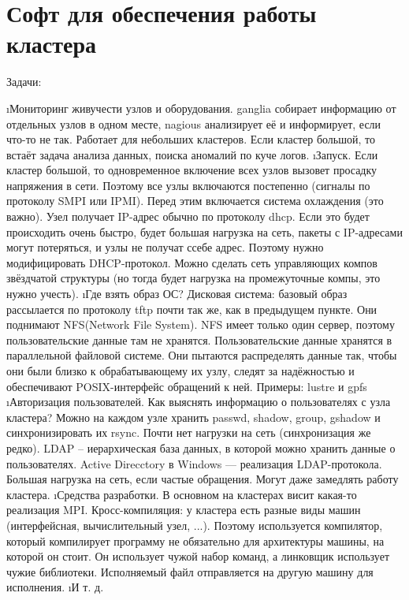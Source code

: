 \section{Софт для обеспечения работы кластера}
Задачи:
\begin{enumerate}
 \i Мониторинг живучести узлов и оборудования.
 ganglia собирает информацию от отдельных узлов  в одном месте, nagious анализирует её и информирует, если что-то не так. Работает для небольших кластеров.
 Если кластер большой, то встаёт задача анализа данных, поиска аномалий по куче логов. 
 \i Запуск. Если кластер большой, то одновременное включение всех узлов вызовет просадку напряжения в сети. Поэтому все узлы включаются постепенно (сигналы по протоколу SMPI или IPMI).
  Перед этим включается система охлаждения (это важно). 
  Узел получает IP-адрес обычно по протоколу dhcp. Если это будет происходить очень быстро, будет большая нагрузка на сеть, пакеты с IP-адресами могут потеряться, и узлы не получат ссебе адрес. Поэтому нужно модифицировать DHCP-протокол. Можно сделать сеть управляющих компов звёздчатой структуры (но тогда будет нагрузка на промежуточные компы, это нужно учесть).
 \i Где взять образ ОС?
   Дисковая система: базовый образ рассылается по протоколу tftp почти так же, как в предыдущем пункте. Они поднимают NFS(Network File System). NFS имеет только один сервер, поэтому пользовательские данные там не хранятся. 
   Пользовательские данные хранятся в параллельной файловой системе. Они пытаются распределять данные так, чтобы они были близко к обрабатывающему их узлу, следят за надёжностью и обеспечивают POSIX-интерфейс обращений к ней. Примеры: lustre и gpfs
  \i Авторизация пользователей.
   Как выяснять информацию о пользователях с узла кластера?
   Можно на каждом узле хранить passwd, shadow, group, gshadow и синхронизировать их rsync. Почти нет нагрузки на сеть (синхронизация же редко).
   LDAP -- иерархическая база данных, в которой можно хранить данные о пользователях. Active Direcctory в Windows --- реализация LDAP-протокола. Большая нагрузка на сеть, если частые обращения. Могут даже замедлять работу кластера.
  \i Средства разработки. В основном на кластерах висит какая-то реализация MPI.
  Кросс-компиляция: у кластера есть разные виды машин (интерфейсная, вычислительный узел, ...). Поэтому используется компилятор, который компилирует программу не обязательно для архитектуры машины, на которой он стоит. Он использует чужой набор команд, а линковщик использует чужие библиотеки. Исполняемый файл отправляется на другую машину для исполнения. 
  \i И т. д. 
\end{enumerate}

